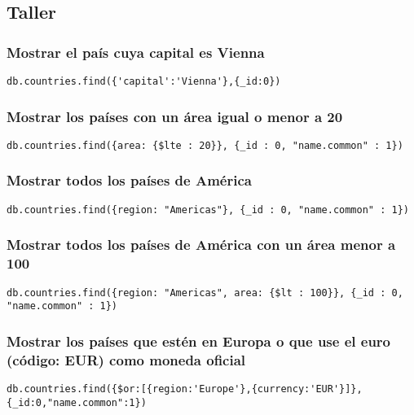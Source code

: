 \subsection*{Taller}

\subsubsection*{Mostrar el país cuya capital es Vienna}

\begin{verbatim}
db.countries.find({'capital':'Vienna'},{_id:0})
\end{verbatim}

\subsubsection*{Mostrar los países con un área igual o menor a 20}

\begin{verbatim}
db.countries.find({area: {$lte : 20}}, {_id : 0, "name.common" : 1})
\end{verbatim}

\subsubsection*{Mostrar todos los países de América}

\begin{verbatim}
db.countries.find({region: "Americas"}, {_id : 0, "name.common" : 1})
\end{verbatim}

\subsubsection*{Mostrar todos los países de América con un área menor a 100}

\begin{verbatim}
db.countries.find({region: "Americas", area: {$lt : 100}}, {_id : 0, "name.common" : 1})
\end{verbatim}

\subsubsection*{Mostrar los países que estén en Europa o que use el euro (código: EUR) como moneda oficial}

\begin{verbatim}
db.countries.find({$or:[{region:'Europe'},{currency:'EUR'}]},{_id:0,"name.common":1})
\end{verbatim}

